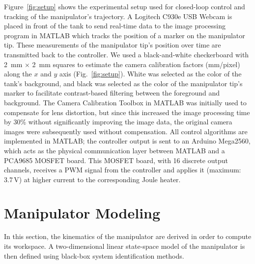 Figure~\ref{fig:setup} shows the experimental setup used for closed-loop control and tracking of the manipulator's trajectory. A Logitech C930e USB Webcam is placed in front of the tank to send real-time data to the image processing program in MATLAB which tracks the position of a marker on the manipulator tip. These measurements of the manipulator tip's position over time are transmitted back to the controller. We used a black-and-white checkerboard with 2~mm $\times$ 2~mm squares to estimate the camera calibration factors (mm/pixel) along the $x$ and $y$ axis (Fig.~\ref{fig:setup}). White was selected as the color of the tank's background, and black was selected as the color of the manipulator tip's marker to facilitate contrast-based filtering between the foreground and background. The Camera Calibration Toolbox in MATLAB was initially used to compensate for lens distortion, but since this increased the image processing time by 30\% without significantly improving the image data, the original camera images were subsequently used without compensation. All control algorithms are implemented in MATLAB; the controller output is sent to an Arduino Mega2560, which acts as the physical communication layer between MATLAB and a  PCA9685 MOSFET board. This MOSFET board, with 16 discrete output channels, receives a PWM signal from the controller and applies it (maximum: 3.7\,V) at higher current to the corresponding Joule heater.

\section{Manipulator Modeling}

In this section, the kinematics of the manipulator are derived in order to compute its workspace. A two-dimensional linear state-space model of the manipulator is then defined using black-box system identification methods. 


